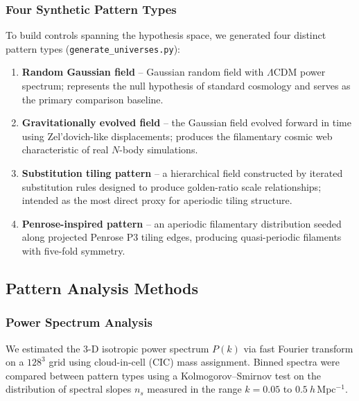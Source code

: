 \documentclass[12pt,a4paper]{article}
\begin{document}
\subsubsection{Four Synthetic Pattern Types}

To build controls spanning the hypothesis space, we generated four distinct
pattern types (\texttt{generate\_universes.py}):

\begin{enumerate}
  \item \textbf{Random Gaussian field} -- Gaussian random field with $\Lambda$CDM
        power spectrum; represents the null hypothesis of standard cosmology and
        serves as the primary comparison baseline.

  \item \textbf{Gravitationally evolved field} -- the Gaussian field evolved
        forward in time using Zel'dovich-like displacements; produces the
        filamentary cosmic web characteristic of real $N$-body simulations.

  \item \textbf{Substitution tiling pattern} -- a hierarchical field constructed
        by iterated substitution rules designed to produce golden-ratio scale
        relationships; intended as the most direct proxy for aperiodic tiling
        structure.

  \item \textbf{Penrose-inspired pattern} -- an aperiodic filamentary distribution
        seeded along projected Penrose P3 tiling edges, producing quasi-periodic
        filaments with five-fold symmetry.
\end{enumerate}

\subsection{Pattern Analysis Methods}
\label{sec:analysis}

\subsubsection{Power Spectrum Analysis}

We estimated the 3-D isotropic power spectrum $P(k)$ via fast Fourier transform
on a $128^3$ grid using cloud-in-cell (CIC) mass assignment.  Binned spectra
were compared between pattern types using a Kolmogorov--Smirnov test on the
distribution of spectral slopes $n_s$ measured in the range $k = 0.05$ to
$0.5\ h$\,Mpc$^{-1}$.
\end{document}
